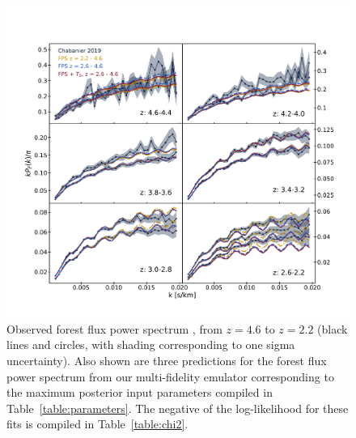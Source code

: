 \begin{figure}
    \centering
    \includegraphics[width=\textwidth]{figures/fps_data_fit.pdf}
    \caption{\label{fig:fps_data}
    Observed \lya forest flux power spectrum \cite{2019JCAP...07..017C}, from $z=4.6$ to $z=2.2$ (black lines and circles, with shading corresponding to one sigma uncertainty).
    Also shown are three predictions for the \lya forest flux power spectrum from our multi-fidelity emulator corresponding to the maximum posterior input parameters compiled in Table~\ref{table:parameters}.
    The negative of the log-likelihood for these fits is compiled in Table~\ref{table:chi2}.
    }
\end{figure}

